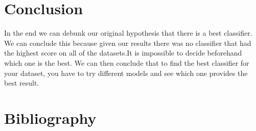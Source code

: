 \documentclass{article}
\begin{document}
\section{Conclusion}
In the end we can debunk our original hypothesis that there is a best classifier. We can conclude this because given our results there was no classifier that had the highest score on all of the datasets.It is impossible to decide beforehand which one is the best. We can then conclude that to find  the best classifier for your dataset, you have to try different models and see which one provides the best result.


\section{Bibliography}
\nocite{*}
\raggedright


 
\end{document}

